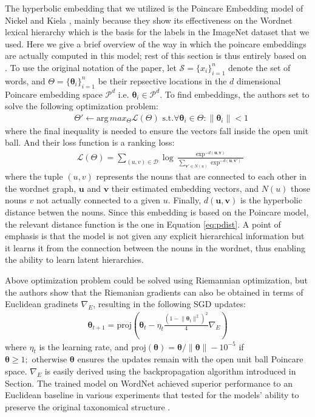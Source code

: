 \documentclass[12pt]{report}
\begin{document}
The hyperbolic embedding that we utilized is the Poincare Embedding model of Nickel and Kiela \cite{Nickel2017}, mainly because they show its effectiveness on the Wordnet lexical hierarchy which is the basis for the labels in the ImageNet dataset that we used. Here we give a brief overview of the way in which the poincare embeddings are actually computed in this model; rest of this section is thus entirely based on \cite{Nickel2017}.  To use the original notation of the paper, let $\mathcal{S} = \{x_i\}_{i=1}^n$ denote the set of words, and $\Theta = \{\boldsymbol{\theta}_i\}_{i=1}^n$ be their repsective locations in the $d$ dimensional Poincare embedding space $\mathcal{P}^d$ i.e. $\boldsymbol{\theta}_i \in \mathcal{P}^d$. To find embeddings, the authors set to solve the following optimization problem:
\begin{align*}
  &\Theta' \leftarrow \text{arg}\,max_{\Theta} \mathcal{L}\left(\Theta\right)\text{  s.t.} \forall \boldsymbol{\theta}_i \in \Theta : \lVert \boldsymbol{\theta}_i \rVert < 1
\end{align*}
where the final inequality is needed to ensure the vectors fall inside the open unit ball. And their loss function is a ranking loss:
\begin{align*}
  &\mathcal{L} \left(\Theta\right) = \sum_{(u,v) \in \mathcal{D}} \log \frac{\exp^{-d( \mathbf{u},\mathbf{v})}}{\sum_{\mathbf{v'}\in N(u)}\exp^{-d(\mathbf{u},\mathbf{v'})}}
\end{align*}
where the tuple $(u,v)$ represents the nouns that are connected to each other in the wordnet graph, $\mathbf{u}$ and $\mathbf{v}$ their estimated embedding vectors, and $N(u)$ those nouns $v$ not actually connected to a given $u$. Finally, $d(\mathbf{u}, \mathbf{v})$ is the hyperbolic distance betwen the nouns. Since this embedding is based on the Poincare model, the relevant distance function is the one in Equation \ref{eq:pdist}. A point of emphasis is that the model is not given any explicit hierarchical information but it learns it from the connection between the nouns in the wordnet, thus enabling the ability to learn latent hierarchies. 

Above optimization problem could be solved using Riemannian optimization, but the authors show that the Riemanian gradients can also be obtained in terms of Euclidean gradinets $\nabla_E$, resulting in the following SGD updates:  
\begin{align*}
  \boldsymbol{\theta}_{t+1} = \text{proj} \left( \boldsymbol{\theta}_t -\eta_t \frac{(1-\lVert\boldsymbol{\theta}_t\rVert^2)^2}{4}\nabla_E \right)
\end{align*}
where $\eta_t$ is the learning rate, and $\text{proj}(\boldsymbol{\theta}) = \boldsymbol{\theta}/\lVert \boldsymbol{\theta} \rVert - 10^{-5}$ if $ \boldsymbol{\theta} \geq 1; \text{ otherwise } \boldsymbol{\theta}$ ensures the updates remain with the open unit ball Poincare space. $\nabla_E$ is easily derived using the backpropagation algorithm introduced in Section. The trained model on WordNet achieved superior performance to an Euclidean baseline in various experiments that tested for the models' ability to preserve the original taxonomical structure \cite{Nickel2017}.






\end{document}
